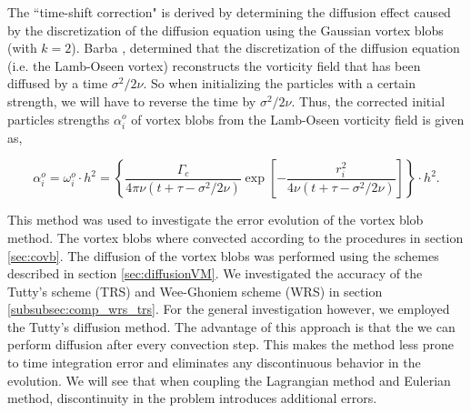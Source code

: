 The ``time-shift correction" is derived by determining the diffusion effect caused by the discretization of the diffusion equation using the Gaussian vortex blobs (with $k=2$). Barba \cite{Barba2004c}, determined that the discretization of the diffusion equation (i.e. the Lamb-Oseen vortex) reconstructs the vorticity field that has been diffused by a time $\sigma^2/2\nu$. So when initializing the particles with a certain strength, we will have to reverse the time by $\sigma^2/2\nu$. Thus, the corrected initial particles strengths $\alpha_i^o$ of vortex blobs from the Lamb-Oseen vorticity field is given as,

	\begin{equation}
	\alpha_i^o = \omega_i^o\cdot h^2 = \left\{ \frac{\Gamma_c}{4\pi\nu\left(t+\tau-\sigma^2/2\nu\right)} \exp\left[-\frac{r_i^2}{4\nu\left(t+\tau-\sigma^2/2\nu\right)}\right] \right\} \cdot h^2.
	\label{eq:lo_pie}
	\end{equation}
	
This method was used to investigate the error evolution of the vortex blob method. The vortex blobs where convected according to the procedures in section \ref{sec:covb}. The diffusion of the vortex blobs was performed using the schemes described in section \ref{sec:diffusionVM}. We investigated the accuracy of the Tutty's scheme (TRS) and Wee-Ghoniem scheme (WRS) in section \ref{subsubsec:comp_wrs_trs}. For the general investigation however, we employed the Tutty's diffusion method. The advantage of this approach is that the we can perform diffusion after every convection step. This makes the method less prone to time integration error and eliminates any discontinuous behavior in the evolution. We will see that when coupling the Lagrangian method and Eulerian method, discontinuity in the problem introduces additional errors.

